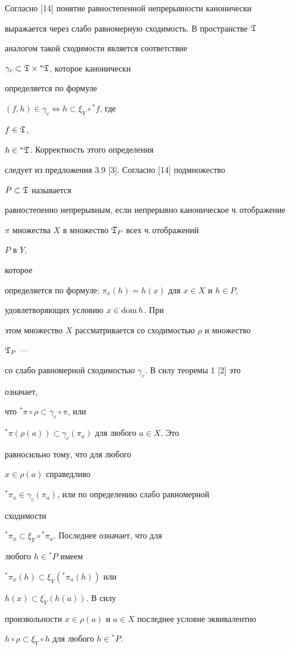 \begin{pf}


Согласно [14] понятие равностепенной непрерывности канонически


выражается через слабо равномерную сходимость. В пространстве $\frak T$


аналогом такой сходимости является соответствие


$\gamma_c\subset\frak T\times{}^*\frak T$, которое канонически


определяется по формуле


$(f,h)\in\gamma_c\Longleftrightarrow h\subset\xi_Y\circ {}^*f$, где


$f\in\frak T$,


$h\in{}^*\frak T$. Корректность этого определения


следует из предложения 3.9 [3]. Согласно [14] подмножество


$P\subset\frak T$ называется


равностепенно непрерывным, если непрерывно каноническое ч.\,отображение


$\pi$ множества $X$ в множество $\frak T_P$ всех ч.\,отображений


$P$ в $Y$,


которое


определяется по формуле: $\pi_x(h)=h(x)$ для $x\in X$ и $h\in P$,


удовлетворяющих условию $x\in\operatorname{dom} h$. При


этом множество $X$ рассматривается со сходимостью $\rho$ и множество


$\frak T_P$ ---


со слабо равномерной сходимостью $\gamma_c$. В силу теоремы 1 [2] это


означает,


что ${}^*\pi\circ \rho\subset\gamma_c\circ \pi$, или


${}^*\pi(\rho(a))\subset\gamma_c(\pi_a)$ для любого $a\in X$. Это


равносильно тому, что для любого


$x\in\rho(a)$ справедливо


${}^*\pi_x\in\gamma_c(\pi_a)$, или по определению слабо равномерной


сходимости


${}^*\pi_x\subset\xi_Y\circ {}^*\pi_a$. Последнее означает, что для


любого $h\in{}^*P$ имеем


${}^*\pi_x(h)\subset\xi_Y({}^*\pi_a(h))$ или


$h(x)\subset\xi_Y(h(a))$. В силу


произвольности $x\in\rho(a)$ и $a\in X$ последнее условие эквивалентно


$h\circ \rho\subset\xi_Y\circ h$ для любого $h\in{}^*P$.


\end{pf}





